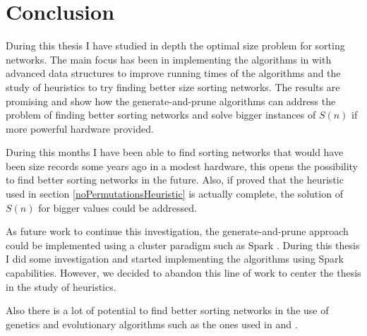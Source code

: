 \documentclass[../main.tex]{subfiles}
\begin{document}
	\section{Conclusion}
	During this thesis I have studied in depth the optimal size problem for sorting networks. The main focus has been in implementing the algorithms in \cite{sortingnineinputs} with advanced data structures to improve running times of the algorithms and the study of heuristics to try finding better size sorting networks. The results are promising and show how the generate-and-prune algorithms can address the problem of finding better sorting networks and solve bigger instances of $S(n)$ if more powerful hardware provided.
	
	During this months I have been able to find sorting networks that would have been size records some years ago in a modest hardware, this opens the possibility to find better sorting networks in the future. Also, if proved that the heuristic used in section \ref{noPermutationsHeuristic} is actually complete, the solution of $S(n)$ for bigger values could be addressed.
	
	As future work to continue this investigation, the generate-and-prune approach could be implemented using a cluster paradigm such as Spark \cite{spark}. During this thesis I did some investigation and started implementing the algorithms using Spark capabilities. However, we decided to abandon this line of work to center the thesis in the study of heuristics. 
	
	Also there is a lot of potential to find better sorting networks in the use of genetics and evolutionary algorithms such as the ones used in \cite{valsalam:jmlr13} and \cite{Sekanina2005}.
	\newpage
\end{document}
